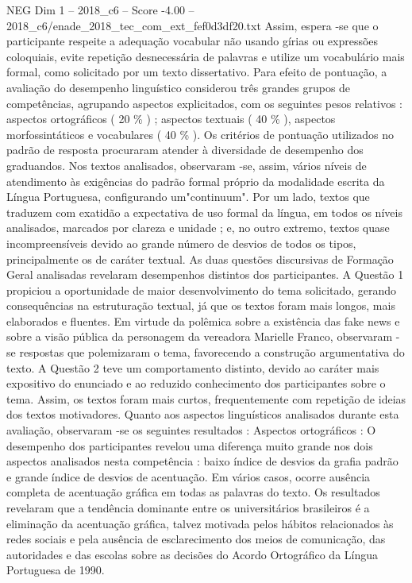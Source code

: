 \begin{textsample}{NEG Dim 1 – 2018\_c6 – Score -4.00 – 2018\_c6/enade\_2018\_tec\_com\_ext\_fef0d3df20.txt}
Assim, espera -se que o participante respeite a adequação vocabular não usando gírias ou expressões coloquiais, evite repetição desnecessária de palavras e utilize um vocabulário mais formal, como solicitado por um texto dissertativo.
Para efeito de pontuação, a avaliação do desempenho linguístico considerou três grandes grupos de competências, agrupando aspectos explicitados, com os seguintes pesos relativos : aspectos ortográficos ( 20 \% ) ; aspectos textuais ( 40 \% ), aspectos morfossintáticos e vocabulares ( 40 \% ).
Os critérios de pontuação utilizados no padrão de resposta procuraram atender à diversidade de desempenho dos graduandos.
Nos textos analisados, observaram -se, assim, vários níveis de atendimento às exigências do padrão formal próprio da modalidade escrita da Língua Portuguesa, configurando um"continuum".
Por um lado, textos que traduzem com exatidão a expectativa de uso formal da língua, em todos os níveis analisados, marcados por clareza e unidade ; e, no outro extremo, textos quase incompreensíveis devido ao grande número de desvios de todos os tipos, principalmente os de caráter textual.
As duas questões discursivas de Formação Geral analisadas revelaram desempenhos distintos dos participantes.
A Questão 1 propiciou a oportunidade de maior desenvolvimento do tema solicitado, gerando consequências na estruturação textual, já que os textos foram mais longos, mais elaborados e fluentes.
Em virtude da polêmica sobre a existência das fake news e sobre a visão pública da personagem da vereadora Marielle Franco, observaram -se respostas que polemizaram o tema, favorecendo a construção argumentativa do texto.
A Questão 2 teve um comportamento distinto, devido ao caráter mais expositivo do enunciado e ao reduzido conhecimento dos participantes sobre o tema.
Assim, os textos foram mais curtos, frequentemente com repetição de ideias dos textos motivadores.
Quanto aos aspectos linguísticos analisados durante esta avaliação, observaram -se os seguintes resultados : Aspectos ortográficos : O desempenho dos participantes revelou uma diferença muito grande nos dois aspectos analisados nesta competência : baixo índice de desvios da grafia padrão e grande índice de desvios de acentuação.
Em vários casos, ocorre ausência completa de acentuação gráfica em todas as palavras do texto.
Os resultados revelaram que a tendência dominante entre os universitários brasileiros é a eliminação da acentuação gráfica, talvez motivada pelos hábitos relacionados às redes sociais e pela ausência de esclarecimento dos meios de comunicação, das autoridades e das escolas sobre as decisões do Acordo Ortográfico da Língua Portuguesa de 1990.

\end{textsample}
